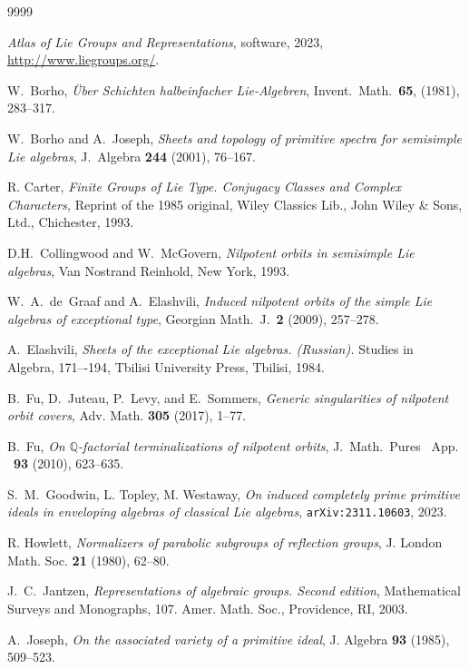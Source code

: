 \documentclass[11pt]{amsart}
\newcommand{\bQ}{{\mathbb Q}}
\newcommand{\arxiv}[1]{{\tt arXiv:#1}}
\numberwithin{equation}{section}
\begin{document}
	\begin{thebibliography}{9999}
		
		 {\em Atlas of Lie Groups and Representations}, software, 2023, \url{http://www.liegroups.org/}.
		
		  W.~Borho,
		{\em {\"U}ber Schichten halbeinfacher Lie-Algebren},
		Invent.\ Math.\ {\bf 65}, (1981), 283--317.
		
		 W.~Borho and A.~Joseph,
		{\em Sheets and topology of primitive spectra for semisimple Lie algebras},
		J.\ Algebra {\bf 244} (2001), 76--167.
		
		 R. Carter, {\em Finite Groups of Lie Type. Conjugacy Classes and Complex Characters,} Reprint of the 1985 original, Wiley Classics Lib., John Wiley \& Sons, Ltd., Chichester, 1993.
		
		 D.H.~Collingwood and W.~McGovern,
		{\em Nilpotent orbits in semisimple Lie algebras},  Van Nostrand Reinhold, New York, 1993.
		
		 W.~A.~de~Graaf and A.~Elashvili,
		{\em Induced nilpotent orbits of the simple Lie algebras of exceptional type},
		Georgian Math.\ J.\ {\bf 2} (2009), 257--278.
		
		 A.~Elashvili, {\em Sheets of the exceptional Lie algebras. (Russian).} Studies in Algebra,
		171–-194, Tbilisi University Press, Tbilisi, 1984.
		
		 B.~Fu, D.~Juteau, P.~Levy, and E.~Sommers, {\em Generic singularities of nilpotent orbit covers}, Adv. Math. {\bf 305} (2017), 1--77. 
		
		 B.~Fu, {\em On $\bQ$-factorial terminalizations of nilpotent orbits}, J.\ Math.\ Pures \ App. \ {\bf 93} (2010), 623--635. 
		
		 S.~M.~Goodwin, L. Topley, M. Westaway, {\em On induced completely prime primitive ideals in enveloping algebras of classical Lie algebras}, \arxiv{2311.10603}, 2023.
		
		 R. Howlett, {\em Normalizers of parabolic subgroups of reflection groups}, J. London Math. Soc. {\bf 21} (1980), 62--80.
		
		 J.~C.~Jantzen, {\em Representations of algebraic groups. Second edition}, Mathematical Surveys and Monographs, 107. Amer. Math. Soc., Providence, RI, 2003.
		
		  A.~Joseph,
		{\em On the associated variety of a primitive ideal}, J. Algebra {\bf 93} (1985), 509--523.
		

\end{thebibliography}
\end{document}
